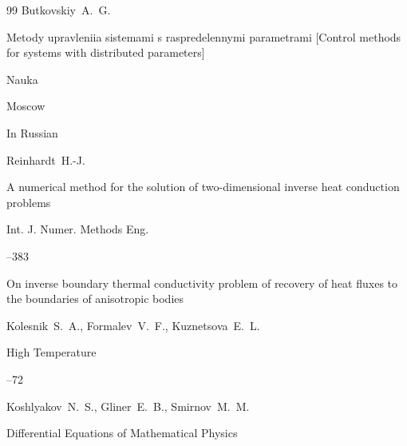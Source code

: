 \begin{thebibliography}{99}
\by Butkovskiy~A.~G.

\book Metody upravleniia sistemami s raspredelennymi parametrami \rm [Control methods for systems with distributed parameters]


\publ Nauka

\publaddr Moscow

\lang In Russian





\by Reinhardt~H.-J.

\paper A numerical method for the solution of two-dimensional inverse heat conduction problems

\jour Int. J. Numer. Methods Eng.




--383





\paper On inverse boundary thermal conductivity problem of recovery of heat fluxes to the boundaries of anisotropic bodies

\by Kolesnik~S.~A.,  Formalev~V.~F.,  Kuznetsova~E.~L.

\jour High Temperature




--72










\by Koshlyakov~N.~S., Gliner~E.~B., Smirnov~M.~M. 

\book Differential Equations of Mathematical Physics


\end{thebibliography}
